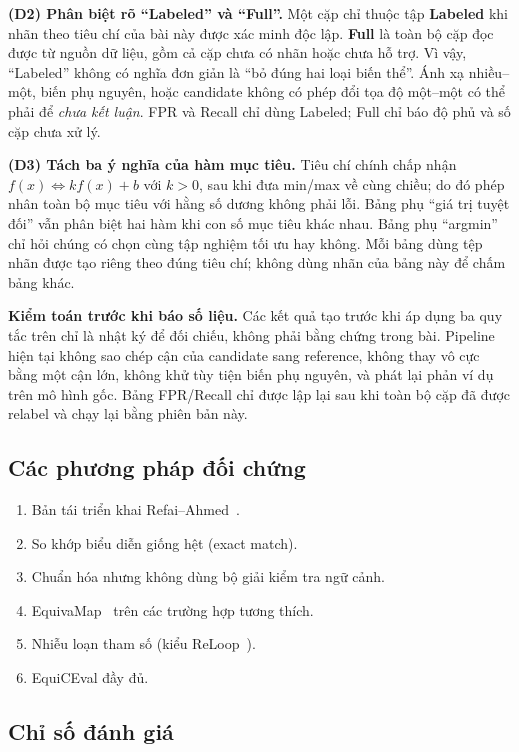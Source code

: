 \documentclass[11pt,a4paper]{article}
\theoremstyle{plain}
\theoremstyle{definition}
\theoremstyle{remark}
\newcommand{\method}{\textsf{EquiCEval}\xspace}
\begin{document}
\textbf{(D2) Phân biệt rõ ``Labeled'' và ``Full''.}
Một cặp chỉ thuộc tập \textbf{Labeled} khi nhãn theo tiêu chí của bài này được
xác minh độc lập. \textbf{Full} là toàn bộ cặp đọc được từ nguồn dữ liệu, gồm cả
cặp chưa có nhãn hoặc chưa hỗ trợ. Vì vậy, ``Labeled'' không có nghĩa đơn giản là
``bỏ đúng hai loại biến thể''. Ánh xạ nhiều--một, biến phụ nguyên, hoặc candidate
không có phép đổi tọa độ một--một có thể phải để \emph{chưa kết luận}. FPR và Recall
chỉ dùng Labeled; Full chỉ báo độ phủ và số cặp chưa xử lý.

\textbf{(D3) Tách ba ý nghĩa của hàm mục tiêu.}
Tiêu chí chính chấp nhận $f(x) \Leftrightarrow k f(x)+b$ với $k>0$, sau khi đưa
min/max về cùng chiều; do đó phép nhân toàn bộ mục tiêu với hằng số dương không
phải lỗi. Bảng phụ ``giá trị tuyệt đối'' vẫn phân biệt hai hàm khi con số mục tiêu
khác nhau. Bảng phụ ``argmin'' chỉ hỏi chúng có chọn cùng tập nghiệm tối ưu hay
không. Mỗi bảng dùng tệp nhãn được tạo riêng theo đúng tiêu chí; không dùng nhãn
của bảng này để chấm bảng khác.

\textbf{Kiểm toán trước khi báo số liệu.}
Các kết quả tạo trước khi áp dụng ba quy tắc trên chỉ là nhật ký để đối chiếu, không
phải bằng chứng trong bài. Pipeline hiện tại không sao chép cận của candidate sang
reference, không thay vô cực bằng một cận lớn, không khử tùy tiện biến phụ nguyên,
và phát lại phản ví dụ trên mô hình gốc. Bảng FPR/Recall chỉ được lập lại sau khi
toàn bộ cặp đã được relabel và chạy lại bằng phiên bản này.

\subsection{Các phương pháp đối chứng}

\begin{enumerate}
  \item Bản tái triển khai Refai--Ahmed~\parencite{refai2025component}.
  \item So khớp biểu diễn giống hệt (exact match).
  \item Chuẩn hóa nhưng không dùng bộ giải kiểm tra ngữ cảnh.
  \item EquivaMap~\parencite{zhai2025equivamap} trên các trường hợp tương thích.
  \item Nhiễu loạn tham số (kiểu ReLoop~\parencite{lian2026reloop}).
  \item \method đầy đủ.
\end{enumerate}

\subsection{Chỉ số đánh giá}
\end{document}
